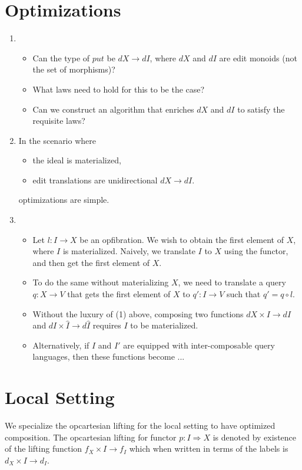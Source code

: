 \documentclass[a4paper,10pt]{article}
\begin{document}
\section{Optimizations}
\begin{enumerate}
 \item \begin{itemize}
         \item Can the type of $put$ be $dX \to dI$, where $dX$ and $dI$ are edit monoids (not the set of morphisms)? 
         \item What laws need to hold for this to be the case?
         \item Can we construct an algorithm that enriches $dX$ and $dI$ to satisfy the requisite laws?
       \end{itemize}
 \item In the scenario where \begin{itemize}
        \item the ideal is materialized, 
        \item edit translations are unidirectional $dX \to dI$.
       \end{itemize} optimizations are simple.
 \item \begin{itemize}
        \item Let $l: I \to X$ be an opfibration. We wish to obtain the first element of $X$, where $I$ is materialized. Naively, we translate $I$ to $X$ using the functor, and then get the first element of $X$.
        \item To do the same without materializing $X$, we need to translate a query $q : X \to V$ that gets the first element of $X$ to $q' : I \to V$ such that $q' = q \circ l$.
        \item Without the luxury of (1) above, composing two functions $dX \times I \to dI$ and $dI \times \hat{I} \to d\hat{I}$ requires $I$ to be materialized.
        \item Alternatively, if $I$ and $I'$ are equipped with inter-composable query languages, then these functions become ...
       \end{itemize}
 
\end{enumerate}

\section{Local Setting}
We specialize the opcartesian lifting for the local setting to have
optimized composition. The opcartesian lifting for functor $p: I
\Rightarrow X$ is denoted by existence of the lifting function $f_X
\times I \to f_I$ which when written in terms of the labels is $d_X
\times I \to d_I$. 
\end{document}

